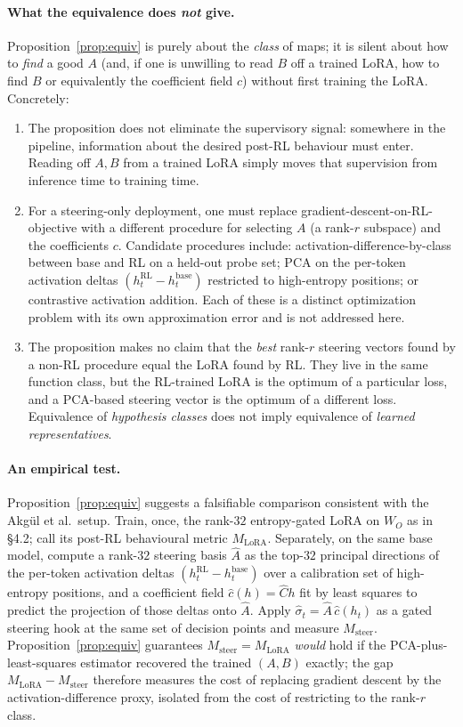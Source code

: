 \documentclass[11pt]{article}
\begin{document}
\paragraph{What the equivalence does \emph{not} give.}
Proposition~\ref{prop:equiv} is purely about the \emph{class} of maps; it is silent about how to \emph{find} a good $A$ (and, if one is unwilling to read $B$ off a trained LoRA, how to find $B$ or equivalently the coefficient field $c$) without first training the LoRA. Concretely:
\begin{enumerate}
\item The proposition does not eliminate the supervisory signal: somewhere in the pipeline, information about the desired post-RL behaviour must enter. Reading off $A, B$ from a trained LoRA simply moves that supervision from inference time to training time.
\item For a steering-only deployment, one must replace gradient-descent-on-RL-objective with a different procedure for selecting $A$ (a rank-$r$ subspace) and the coefficients $c$. Candidate procedures include: activation-difference-by-class between base and RL on a held-out probe set; PCA on the per-token activation deltas $(h_t^{\mathrm{RL}} - h_t^{\mathrm{base}})$ restricted to high-entropy positions; or contrastive activation addition. Each of these is a distinct optimization problem with its own approximation error and is not addressed here.
\item The proposition makes no claim that the \emph{best} rank-$r$ steering vectors found by a non-RL procedure equal the LoRA found by RL. They live in the same function class, but the RL-trained LoRA is the optimum of a particular loss, and a PCA-based steering vector is the optimum of a different loss. Equivalence of \emph{hypothesis classes} does not imply equivalence of \emph{learned representatives}.
\end{enumerate}

\paragraph{An empirical test.}
Proposition~\ref{prop:equiv} suggests a falsifiable comparison consistent with the Akg\"{u}l et al.\ setup. Train, once, the rank-$32$ entropy-gated LoRA on $W_O$ as in \S 4.2; call its post-RL behavioural metric $M_{\mathrm{LoRA}}$. Separately, on the same base model, compute a rank-$32$ steering basis $\widehat{A}$ as the top-$32$ principal directions of the per-token activation deltas $(h_t^{\mathrm{RL}} - h_t^{\mathrm{base}})$ over a calibration set of high-entropy positions, and a coefficient field $\widehat{c}(h) = \widehat{C} h$ fit by least squares to predict the projection of those deltas onto $\widehat{A}$. Apply $\widehat{\sigma}_t = \widehat{A}\,\widehat{c}(h_t)$ as a gated steering hook at the same set of decision points and measure $M_{\mathrm{steer}}$. Proposition~\ref{prop:equiv} guarantees $M_{\mathrm{steer}} = M_{\mathrm{LoRA}}$ \emph{would} hold if the PCA-plus-least-squares estimator recovered the trained $(A,B)$ exactly; the gap $M_{\mathrm{LoRA}} - M_{\mathrm{steer}}$ therefore measures the cost of replacing gradient descent by the activation-difference proxy, isolated from the cost of restricting to the rank-$r$ class.
\end{document}
